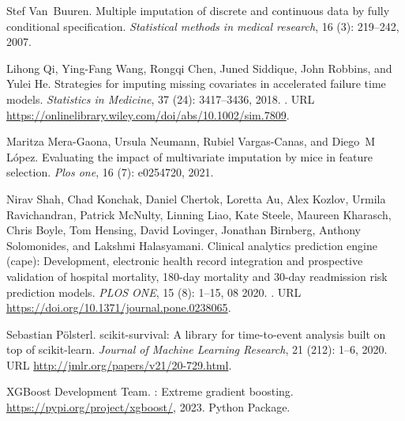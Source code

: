 \documentclass{article}
\begin{document}
\begin{thebibliography}{60}
Stef Van~Buuren.
\newblock Multiple imputation of discrete and continuous data by fully
  conditional specification.
\newblock \emph{Statistical methods in medical research}, 16
  (3): 219--242, 2007.

Lihong Qi, Ying-Fang Wang, Rongqi Chen, Juned Siddique, John Robbins, and Yulei
  He.
\newblock Strategies for imputing missing covariates in accelerated failure
  time models.
\newblock \emph{Statistics in Medicine}, 37 (24): 3417--3436,
  2018.
\newblock {}.
\newblock URL \url{https://onlinelibrary.wiley.com/doi/abs/10.1002/sim.7809}.

Maritza Mera-Gaona, Ursula Neumann, Rubiel Vargas-Canas, and Diego~M L{\'o}pez.
\newblock Evaluating the impact of multivariate imputation by mice in feature
  selection.
\newblock \emph{Plos one}, 16 (7): e0254720, 2021.

Nirav Shah, Chad Konchak, Daniel Chertok, Loretta Au, Alex Kozlov, Urmila
  Ravichandran, Patrick McNulty, Linning Liao, Kate Steele, Maureen Kharasch,
  Chris Boyle, Tom Hensing, David Lovinger, Jonathan Birnberg, Anthony
  Solomonides, and Lakshmi Halasyamani.
\newblock Clinical analytics prediction engine (cape): Development, electronic
  health record integration and prospective validation of hospital mortality,
  180-day mortality and 30-day readmission risk prediction models.
\newblock \emph{PLOS ONE}, 15 (8): 1--15, 08 2020.
\newblock {}.
\newblock URL \url{https://doi.org/10.1371/journal.pone.0238065}.

Sebastian P{\"o}lsterl.
\newblock scikit-survival: A library for time-to-event analysis built on top of
  scikit-learn.
\newblock \emph{Journal of Machine Learning Research}, 21
  (212): 1--6, 2020.
\newblock URL \url{http://jmlr.org/papers/v21/20-729.html}.

{XGBoost Development Team}.
: Extreme gradient boosting.
\newblock \url{https://pypi.org/project/xgboost/}, 2023.
\newblock Python Package.


\end{thebibliography}
\end{document}
